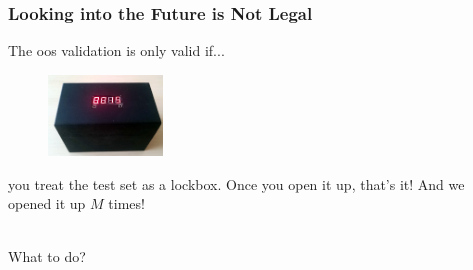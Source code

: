 \documentclass[handout]{beamer}
\begin{document}
\begin{frame}\frametitle{Looking into the Future is Not Legal}

The oos validation is only valid if...

\begin{figure}
\centering
\includegraphics[width=1.2in]{lockbox.png}
\end{figure}

you treat the test set as a lockbox. Once you open it up, that's it! And we opened it up $M$ times!\\~\\ \pause

What to do?
	
\end{frame}
\end{document}
